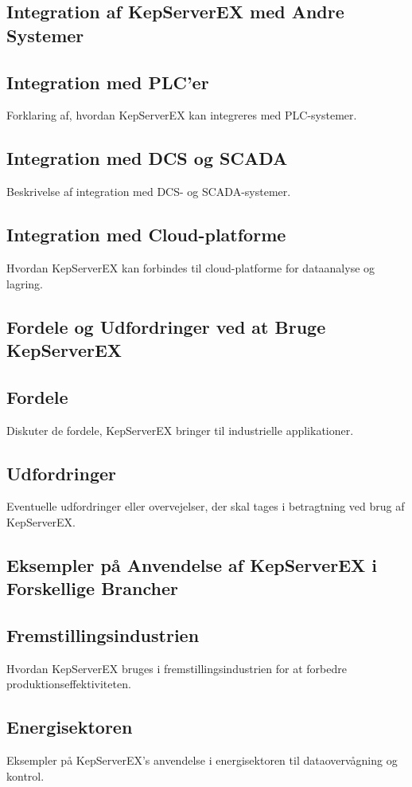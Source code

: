 \subsection{Integration af KepServerEX med Andre Systemer}
\subsection{Integration med PLC'er}
Forklaring af, hvordan KepServerEX kan integreres med PLC-systemer.

\subsection{Integration med DCS og SCADA}
Beskrivelse af integration med DCS- og SCADA-systemer.

\subsection{Integration med Cloud-platforme}
Hvordan KepServerEX kan forbindes til cloud-platforme for dataanalyse og lagring.

\subsection{Fordele og Udfordringer ved at Bruge KepServerEX}
\subsection{Fordele}
Diskuter de fordele, KepServerEX bringer til industrielle applikationer.

\subsection{Udfordringer}
Eventuelle udfordringer eller overvejelser, der skal tages i betragtning ved brug af KepServerEX.

\subsection{Eksempler på Anvendelse af KepServerEX i Forskellige Brancher}
\subsection{Fremstillingsindustrien}
Hvordan KepServerEX bruges i fremstillingsindustrien for at forbedre produktionseffektiviteten.

\subsection{Energisektoren}
Eksempler på KepServerEX's anvendelse i energisektoren til dataovervågning og kontrol.

